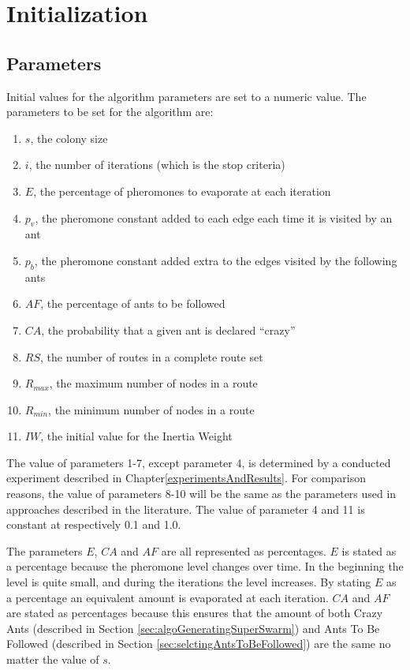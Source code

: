 \section{Initialization}
\label{sec:algoInitialization}
\subsection{Parameters}
Initial values for the algorithm parameters are set to a numeric value. The parameters to be set for the algorithm are:
\begin{enumerate}
\item $s$, the colony size
\item $i$, the number of iterations (which is the stop criteria)
\item $E$, the percentage of pheromones to evaporate at each iteration
\item $p_v$, the pheromone constant added to each edge each time it is visited by an ant
\item $p_b$, the pheromone constant added extra to the edges visited by the following ants 
\item $AF$, the percentage of ants to be followed
\item $CA$, the probability that a given ant is declared ``crazy''
\item $RS$, the number of routes in a complete route set 
\item $R_{max}$, the maximum number of nodes in a route
\item $R_{min}$, the minimum number of nodes in a route
\item $IW$, the initial value for the Inertia Weight
\end{enumerate}

The value of parameters 1-7, except parameter 4, is determined by a conducted experiment described in Chapter\vref{experimentsAndResults}. For comparison reasons, the value of parameters 8-10 will be the same as the parameters used in approaches described in the literature\citep{mandl79, kechagiopoulos14, nikolic14,kidwai98,fan10,chakroborty02,zhang10,chew12,baaj91, mumford13}. The value of parameter 4 and 11 is constant at respectively 0.1 and 1.0.

The parameters $E$, $CA$ and $AF$ are all represented as percentages. $E$ is stated as a percentage because the pheromone level changes over time. In the beginning the level is quite small, and during the iterations the level increases. By stating $E$ as a percentage an equivalent amount is evaporated at each iteration. $CA$ and $AF$ are stated as percentages because this ensures that the amount of both Crazy Ants (described in Section \vref{sec:algoGeneratingSuperSwarm}) and Ants To Be Followed (described in Section \vref{sec:selctingAntsToBeFollowed}) are the same no matter the value of $s$. 

